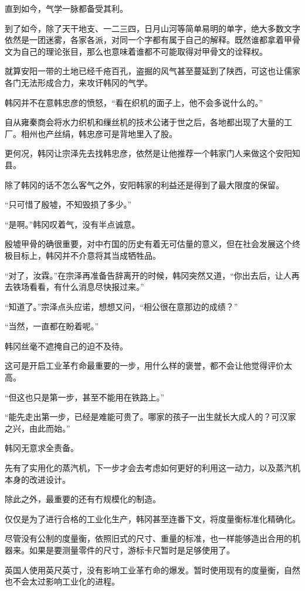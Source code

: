 直到如今，气学一脉都备受其利。

到了如今，除了天干地支、一二三四，日月山河等简单易明的单字，绝大多数文字依然是一团迷雾，各家各派，对同一个字都有属于自己的解释。既然谁都拿着甲骨文为自己的理论张目，那么也意味着谁都不可能取得对甲骨文的诠释权。

就算安阳一带的土地已经千疮百孔，盗掘的风气甚至蔓延到了陕西，可这也让儒家各门无法形成合力，来攻讦韩冈的气学。

韩冈并不在意韩忠彦的愤怒，“看在织机的面子上，他不会多说什么的。”

自从雍秦商会将水力织机和缫丝机的技术公诸于世之后，各地都出现了大量的工厂。相州也产丝绢，韩忠彦可是背地里入了股。

更何况，韩冈让宗泽先去找韩忠彦，依然是让他推荐一个韩家门人来做这个安阳知县。

除了韩冈的话不怎么客气之外，安阳韩家的利益还是得到了最大限度的保留。

“只可惜了殷墟，不知毁损了多少。”

“是啊。”韩冈叹着气，没有半点诚意。

殷墟甲骨的确很重要，对中冇国的历史有着无可估量的意义，但在社会发展这个终极目标上，韩冈并不介意将其当成牺牲品。

“对了，汝霖。”在宗泽再准备告辞离开的时候，韩冈突然又道，“你出去后，让人再去铁场看看，有什么消息尽快报过来。”

“知道了。”宗泽点头应诺，想想又问，“相公很在意那边的成绩？”

“当然，一直都在盼着呢。”

韩冈丝毫不遮掩自己的迫不及待。

这可是开启工业革冇命最重要的一步，用什么样的褒誉，都不会让他觉得评价太高。

“但这也只是第一步，甚至不能用在铁路上。”

“能先走出第一步，已经是难能可贵了。哪家的孩子一出生就长大成人的？可汉家之兴，由此而始。”

韩冈无意求全责备。

先有了实用化的蒸汽机，下一步才会去考虑如何更好的利用这一动力，以及蒸汽机本身的改进设计。

除此之外，最重要的还有冇规模化的制造。

仅仅是为了进行合格的工业化生产，韩冈甚至连番下文，将度量衡标准化精确化。

尽管没有公制的度量衡，依照旧式的尺寸、重量的标准，也一样能够造出合用的机器来。如果是要测量零件的尺寸，游标卡尺暂时是足够使用了。

英国人使用英尺英寸，没有影响工业革冇命的爆发。暂时使用现有的度量衡，自然也不会太过影响工业化的进程。

